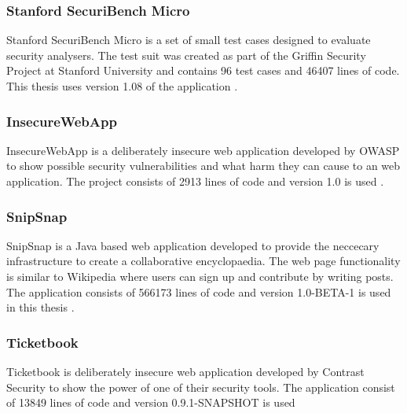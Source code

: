 \subsubsection{Stanford SecuriBench Micro}
Stanford SecuriBench Micro is a set of small test cases designed to evaluate security analysers. The test suit was created as part of the Griffin Security Project \parencite{griffin} at Stanford University and contains 96 test cases and 46407 lines of code. This thesis uses version 1.08 of the application \parencite{securiBenchMicro, microfaq}. 



\subsubsection{InsecureWebApp}
InsecureWebApp is a deliberately insecure web application developed by OWASP to show possible security vulnerabilities and what harm they can cause to an web application. The project consists of 2913 lines of code and version 1.0 is used \parencite{insecure}. 



\subsubsection{SnipSnap}
SnipSnap is a Java based web application developed to provide the neccecary infrastructure to create a collaborative encyclopaedia. The web page functionality is similar to Wikipedia \parencite{wikipedia} where users can sign up and contribute by writing posts. The application consists of 566173 lines of code and version 1.0-BETA-1 is used in this thesis \parencite{snipsnap}. 



\subsubsection{Ticketbook}
Ticketbook is deliberately insecure web application developed by Contrast Security to show the power of one of their security tools. The application consist of 13849 lines of code and version 0.9.1-SNAPSHOT is used \parencite{ticketbook, contrast}